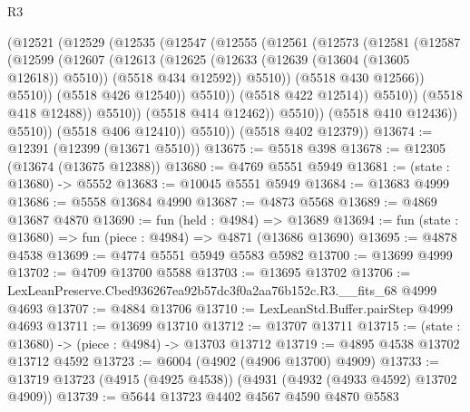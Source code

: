 \begin{lexlean}{R3}
\begin{coremodule}
                            (@12521
                              (@12529
                                (@12535
                                  (@12547
                                    (@12555
                                      (@12561
                                        (@12573
                                          (@12581
                                            (@12587
                                              (@12599
                                                (@12607
                                                  (@12613
                                                    (@12625
                                                      (@12633
                                                        (@12639 (@13604 (@13605 @12618)) @5510))
                                                      (@5518 @434 @12592))
                                                    @5510))
                                                (@5518 @430 @12566))
                                              @5510))
                                          (@5518 @426 @12540))
                                        @5510))
                                    (@5518 @422 @12514))
                                  @5510))
                              (@5518 @418 @12488))
                            @5510))
                        (@5518 @414 @12462))
                      @5510))
                  (@5518 @410 @12436))
                @5510))
            (@5518 @406 @12410))
          @5510))
      (@5518 @402 @12379))
@13674 := @12391 (@12399 (@13671 @5510))
@13675 := @5518 @398
@13678 := @12305 (@13674 (@13675 @12388))
@13680 := @4769 @5551 @5949
@13681 := (state : @13680) -> @5552
@13683 := @10045 @5551 @5949
@13684 := @13683 @4999
@13686 := @5558 @13684 @4990
@13687 := @4873 @5568
@13689 := @4869 @13687 @4870
@13690 := fun (held : @4984) => @13689
@13694 := fun (state : @13680) => fun (piece : @4984) => @4871 (@13686 @13690)
@13695 := @4878 @4538
@13699 := @4774 @5551 @5949 @5583 @5982
@13700 := @13699 @4999
@13702 := @4709 @13700 @5588
@13703 := @13695 @13702
@13706 := LexLeanPreserve.Cbed936267ea92b57dc3f0a2aa76b152c.R3.__fits_68 @4999 @4693
@13707 := @4884 @13706
@13710 := LexLeanStd.Buffer.pairStep @4999 @4693
@13711 := @13699 @13710
@13712 := @13707 @13711
@13715 := (state : @13680) -> (piece : @4984) -> @13703 @13712
@13719 := @4895 @4538 @13702 @13712 @4592
@13723 := @6004 (@4902 (@4906 @13700) @4909)
@13733 := @13719 @13723 (@4915 (@4925 @4538)) (@4931 (@4932 (@4933 @4592) @13702 @4909))
@13739 := @5644 @13723 @4402 @4567 @4590 @4870 @5583

\end{coremodule}
\end{lexlean}
